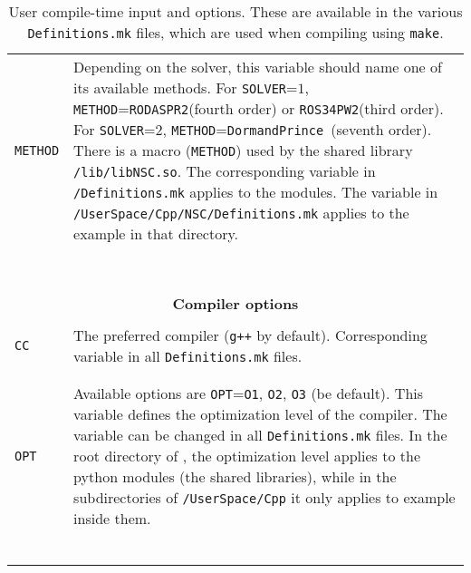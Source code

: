 \documentclass[11pt,a4paper]{article}
\begin{document}
\begin{table}[h!]
\begin{tabular}{l l}
		{\tt METHOD}& \multirow{1}{12cm}{Depending on the solver, this variable should name one of its available methods. For {\tt SOLVER}=$1$, {\tt METHOD}={\tt RODASPR2}(fourth order) or {\tt ROS34PW2}(third order). For {\tt SOLVER}=$2$, {\tt METHOD}={\tt DormandPrince }(seventh order). There is a macro ({\tt METHOD}) used by the shared library {\tt \nsc/lib/libNSC.so}. The corresponding variable in {\tt \nsc/Definitions.mk} applies to the \PY modules. The variable in {\tt \nsc/UserSpace/Cpp/NSC/Definitions.mk} applies to the example in that directory.}\\\\\\\\\\\\\\\\
		 		
		\hline\\[-0.4cm]
		
		\multicolumn{2}{c}{\bf Compiler options}  \\
		\hline\\[-0.4cm]
		
		{\tt CC} &  \multirow{1}{12cm}{The preferred \CPP compiler ({\tt g++} by default). Corresponding variable in all {\tt Definitions.mk} files.} \\\\
		\hline\\[-0.4cm]
		
		{\tt OPT} &  \multirow{1}{12cm}{Available options are {\tt OPT}={\tt O1}, {\tt O2}, {\tt O3} (be default). This variable defines the optimization level of the compiler. The variable can be changed in all {\tt Definitions.mk} files. In the root directory of \nsc, the optimization level applies to the python modules (\ie the shared libraries), while in the subdirectories of {\tt \nsc/UserSpace/Cpp} it only applies to example inside them.}   \\\\\\\\\\\\
		\hline\\[-0.4cm]

	\end{tabular}
	\caption{User compile-time input and options. These are available in the various {\tt Definitions.mk} files, which are used when compiling using {\tt make}.}
	\label{tab:compile_time-options}
\end{table}



\pagebreak
{}
                        
\end{document}
